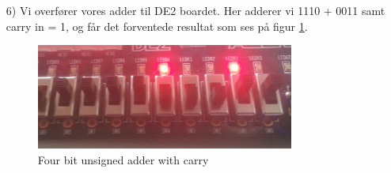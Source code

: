 \begin{enumerate}
	\item[6)]
	Vi overfører vores adder til DE2 boardet. Her adderer vi 1110 + 0011 samt carry in = 1, og får det forventede resultat som ses på figur \ref{fig:4bitUnsignedAdderCarry10100}.
	\begin{figure}[H]
		\centering
		\includegraphics[width=0.8\textwidth]{pictures/Oevelse3/4bit_unsigned_adder_carry3.jpg}
		\caption{Four bit unsigned adder with carry}
		\label{fig:4bitUnsignedAdderCarry10100}
	\end{figure}
	
\end{enumerate}
